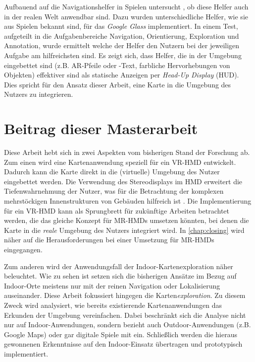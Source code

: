 Aufbauend auf die Navigationshelfer in Spielen untersucht \textcite{Lodts2015}, ob diese Helfer auch in der realen Welt anwendbar sind.
Dazu wurden unterschiedliche Helfer, wie sie aus Spielen bekannt sind, für das \emph{Google Glass} implementiert.
In einem Test, aufgeteilt in die Aufgabenbereiche Navigation, Orientierung, Exploration und Annotation, wurde ermittelt welche der Helfer den Nutzern bei der jeweiligen Aufgabe am hilfreichsten sind.
Es zeigt sich, dass Helfer, die in der Umgebung eingebettet sind (z.B. AR-Pfeile oder -Text, farbliche Hervorhebungen von Objekten) effektiver sind als statische Anzeigen per \emph{Head-Up Display} (HUD).
Dies spricht für den Ansatz dieser Arbeit, eine Karte in die Umgebung des Nutzers zu integrieren.

\section{Beitrag dieser Masterarbeit}
Diese Arbeit hebt sich in zwei Aspekten vom bisherigen Stand der Forschung ab.
Zum einen wird eine Kartenanwendung speziell für ein VR-HMD entwickelt.
Dadurch kann die Karte direkt in die (virtuelle) Umgebung des Nutzer eingebettet werden.
Die Verwendung des Stereodisplays im HMD erweitert die Tiefenwahrnehmung der Nutzer, was für die Betrachtung der komplexen mehrstöckigen Innenstrukturen von Gebäuden hilfreich ist \parencite[vgl.][]{Rantakari2017}.
Die Implementierung für ein VR-HMD kann als Sprungbrett für zukünftige Arbeiten betrachtet werden, die das gleiche Konzept für MR-HMDs umsetzen könnten, bei denen die Karte in die \emph{reale} Umgebung des Nutzers integriert wird.
In \autoref{chap:closing} wird näher auf die Herausforderungen bei einer Umsetzung für MR-HMDs eingegangen.

Zum anderen wird der Anwendungsfall der Indoor-Kartenexploration näher beleuchtet.
Wie zu sehen ist setzen sich die bisherigen Ansätze im Bezug auf Indoor-Orte meistens nur mit der reinen Navigation oder Lokalisierung auseinander.
Diese Arbeit fokussiert hingegen die Karten\emph{exploration}.
Zu diesem Zweck wird analysiert, wie bereits existierende Kartenanwendungen das Erkunden der Umgebung vereinfachen.
Dabei beschränkt sich die Analyse nicht nur auf Indoor-Anwendungen, sondern bezieht auch Outdoor-Anwendungen (z.B. Google Maps) oder gar digitale Spiele mit ein.
Schließlich werden die hieraus gewonnenen Erkenntnisse auf den Indoor-Einsatz übertragen und prototypisch implementiert.
%
\cleardoublepage
